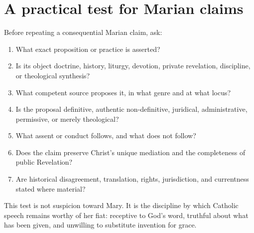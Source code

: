 \section{A practical test for Marian claims}

Before repeating a consequential Marian claim, ask:

\begin{enumerate}
\item What exact proposition or practice is asserted?
\item Is its object doctrine, history, liturgy, devotion, private revelation,
discipline, or theological synthesis?
\item What competent source proposes it, in what genre and at what locus?
\item Is the proposal definitive, authentic non-definitive, juridical,
administrative, permissive, or merely theological?
\item What assent or conduct follows, and what does not follow?
\item Does the claim preserve Christ's unique mediation and the completeness
of public Revelation?
\item Are historical disagreement, translation, rights, jurisdiction, and
currentness stated where material?
\end{enumerate}

This test is not suspicion toward Mary. It is the discipline by which Catholic
speech remains worthy of her fiat: receptive to God's word, truthful about
what has been given, and unwilling to substitute invention for grace.

